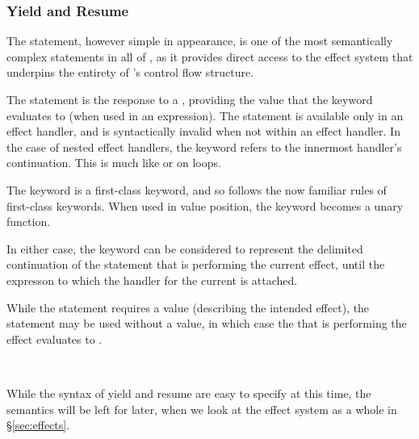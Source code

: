 \subsubsection{Yield and Resume}

The  statement, however simple in appearance, is one of the most
semantically complex statements in all of \Trilogy{}, as it provides direct
access to the effect system that underpins the entirety of \Trilogy{}'s control
flow structure.

The  statement is the response to a , providing the value
that the  keyword evaluates to (when used in an expression). The
 statement is available only in an effect handler, and is syntactically
invalid when not within an effect handler. In the case of nested effect handlers,
the  keyword refers to the innermost handler's continuation. This is
much like  or  on loops.

The  keyword is a first-class keyword, and so follows the now familiar
rules of first-class keywords. When used in value position, the  keyword
becomes a unary function.

In either case, the  keyword can be considered to represent the delimited
continuation of the  statement that is performing the current effect, until the
expresson to which the handler for the current  is attached.

While the  statement requires a value (describing the intended effect), the
 statement may be used without a value, in which case the  that
is performing the effect evaluates to .

\begin{bnf*}
     \\
\end{bnf*}

While the syntax of yield and resume are easy to specify at this time, the semantics
will be left for later, when we look at the effect system as a whole in \S\ref{sec:effects}.
